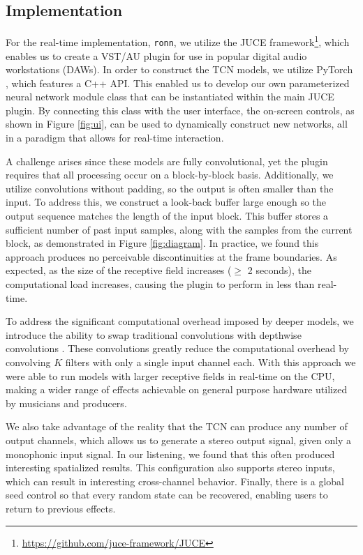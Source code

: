 \documentclass{article}
\begin{document}
\subsection{Implementation}
For the real-time implementation, \texttt{ronn}, we utilize the JUCE framework\footnote{\url{https://github.com/juce-framework/JUCE}},
which enables us to create a VST/AU plugin for use in popular digital audio workstations (DAWs).
In order to construct the TCN models, we utilize PyTorch \cite{pytorch}, which features a C++ API. 
This enabled us to develop our own parameterized neural network module class that can be instantiated within the main JUCE plugin.
By connecting this class with the user interface, the on-screen controls, as shown in Figure \ref{fig:ui},
can be used to dynamically construct new networks, all in a paradigm that allows for real-time interaction. 

A challenge arises since these models are fully convolutional,
yet the plugin requires that all processing occur on a block-by-block basis. 
Additionally, we utilize convolutions without padding, so the output is often smaller than the input. 
To address this, we construct a look-back buffer large enough so the output sequence matches the length of the input block. 
This buffer stores a sufficient number of past input samples, along with the samples from the current block, as demonstrated in Figure \ref{fig:diagram}. 
In practice, we found this approach produces no perceivable discontinuities at the frame boundaries. 
As expected, as the size of the receptive field increases ($\geq$ 2 seconds), the computational load increases, 
causing the plugin to perform in less than real-time.

To address the significant computational overhead imposed by deeper models, 
we introduce the ability to swap traditional convolutions with depthwise convolutions \cite{howard2017mobilenets}.
These convolutions greatly reduce the computational overhead by convolving $K$ filters with only a single input channel each. 
With this approach we were able to run models with larger receptive fields in real-time on the CPU,
making a wider range of effects achievable on general purpose hardware utilized by musicians and producers. 

We also take advantage of the reality that the TCN can produce any number of output channels, 
which allows us to generate a stereo output signal, given only a monophonic input signal. 
In our listening, we found that this often produced interesting spatialized results. 
This configuration also supports stereo inputs, which can result in interesting cross-channel behavior. 
Finally, there is a global seed control so that every random state can be recovered, enabling users to return to previous effects.
\end{document}
